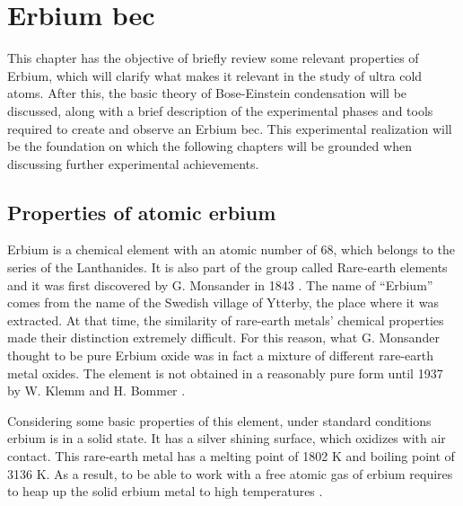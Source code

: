 
\chapter{Erbium \acl*{bec}}
\label{chap:erbium_bec}

This chapter has the objective of briefly review some relevant properties of Erbium, which will clarify what makes it relevant in the study of ultra cold atoms. After this, the basic theory of Bose-Einstein condensation will be discussed, along with a brief description of the experimental phases and tools required to create and observe an Erbium \ac{bec}. This experimental realization will be the foundation on which the following chapters will be grounded when discussing further experimental achievements.

\section{Properties of atomic erbium} \label{sec:erbium_properties}
Erbium is a chemical element with an atomic number of 68, which belongs to the series of the Lanthanides. It is also part of the group called Rare-earth elements and it was first discovered by G. Monsander in 1843 \cite{mosander1843xxx}. The name of ``Erbium'' comes from the name of the Swedish village of Ytterby, the place where it was extracted. At that time, the similarity of rare-earth metals' chemical properties made their distinction extremely difficult. For this reason, what G. Monsander thought to be pure Erbium oxide was in fact a mixture of different rare-earth metal oxides. The element is not obtained in a reasonably pure form until 1937 by W. Klemm and H. Bommer \cite{klemm1937bommer}.

Considering some basic properties of this element, under standard conditions erbium is in a solid state. It has a silver shining surface, which oxidizes with air contact. This rare-earth metal has a melting point of 1802 K and boiling point of 3136 K. As a result, to be able to work with a free atomic gas of erbium requires to heap up the solid erbium metal to high temperatures \cite{emsley1998}.

